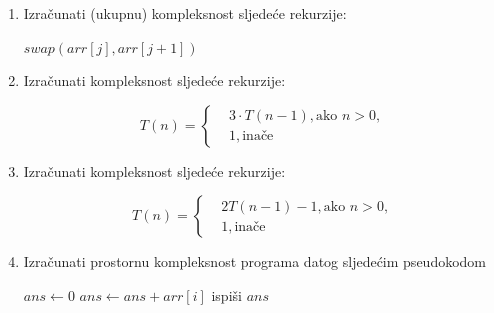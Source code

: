 \begin{enumerate}
\begin{algorithm}[H]
\begin{algorithmic}[1]
                  \EndFor
              \EndIf
          \EndFor
     \EndFor
    \EndProcedure
	\end{algorithmic}
\end{algorithm}


 
 \item Izračunati (ukupnu) kompleksnost sljedeće rekurzije:

\begin{algorithm}[H]
	\begin{algorithmic}[1]
 	  
 		        \State $swap( arr [j] , arr [j+1] )$
 		      \EndIf
 		   \EndFor
 	    \EndFor
		\EndProcedure
	\end{algorithmic}
\end{algorithm}



 
	 
 \item Izračunati kompleksnost sljedeće rekurzije: %
  
 $$	T(n) = 
 \begin{cases}    
         &3\cdot T(n-1), \text{ako }  n > 0 , \\
         & 1, \text{inače} 
   \end{cases}$$

  \item Izračunati kompleksnost sljedeće rekurzije:

$$	T(n) = 
\begin{cases} 
  		&2T(n-1) - 1, \text{ako } n>0, \\
		& 1, \text{inače}
\end{cases}
$$

\item Izračunati prostornu kompleksnost programa datog sljedećim pseudokodom

\begin{algorithm}[H]
	\begin{algorithmic}[1]
		
		\State  $ans \gets 0$
		\State $ans \gets ans+arr[i]$
		\EndFor
		\State ispiši $ans$
		\EndProcedure
	\end{algorithmic}
\end{algorithm}




\end{enumerate}
